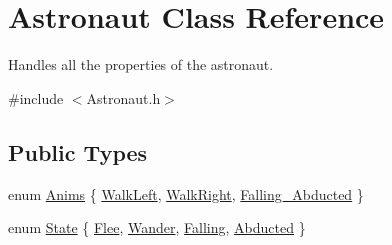 \hypertarget{class_astronaut}{}\section{Astronaut Class Reference}
\label{class_astronaut}


Handles all the properties of the astronaut.  




{\ttfamily \#include $<$Astronaut.\+h$>$}

\subsection*{Public Types}
\begin{DoxyCompactItemize}
\item 
enum \hyperlink{class_astronaut_a36c4be46e5ecdf54256228b3f37d0ba3}{Anims} \{ \hyperlink{class_astronaut_a36c4be46e5ecdf54256228b3f37d0ba3af5bc7e1f65137bfd2ca4f23291f282d8}{Walk\+Left}, 
\hyperlink{class_astronaut_a36c4be46e5ecdf54256228b3f37d0ba3ac615271362fc6d2058af61d13bc5d07a}{Walk\+Right}, 
\hyperlink{class_astronaut_a36c4be46e5ecdf54256228b3f37d0ba3af300bb1b0243d51a6a6e6ac48416b043}{Falling\+\_\+\+Abducted}
 \}
\item 
enum \hyperlink{class_astronaut_ac8bdb05a39112336728de09ce0428c9f}{State} \{ \hyperlink{class_astronaut_ac8bdb05a39112336728de09ce0428c9fa5cfbf42b26cd3105e16fdebca0e00f00}{Flee}, 
\hyperlink{class_astronaut_ac8bdb05a39112336728de09ce0428c9fad608422fad91be9e6303f166e3774136}{Wander}, 
\hyperlink{class_astronaut_ac8bdb05a39112336728de09ce0428c9fa3318318cb25512762266bbc2a0cf3213}{Falling}, 
\hyperlink{class_astronaut_ac8bdb05a39112336728de09ce0428c9fa93070abd8f976010b6e4955962e63a48}{Abducted}
 \}
\end{DoxyCompactItemize}
